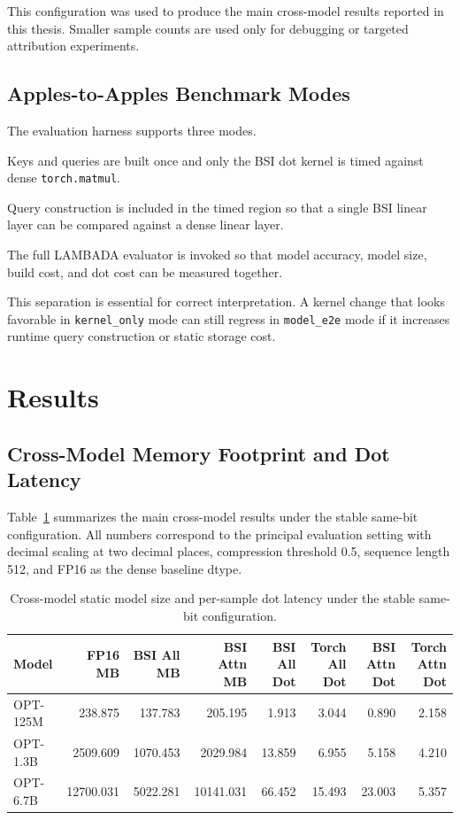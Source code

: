 This configuration was used to produce the main cross-model results reported in this thesis. Smaller sample counts are used only for debugging or targeted attribution experiments.

\subsection{Apples-to-Apples Benchmark Modes}
The evaluation harness supports three modes.

\begin{description}[leftmargin=2em,style=nextline]
\item[\texttt{kernel\_only}] Keys and queries are built once and only the BSI dot kernel is timed against dense \texttt{torch.matmul}.
\item[\texttt{linear\_e2e}] Query construction is included in the timed region so that a single BSI linear layer can be compared against a dense linear layer.
\item[\texttt{model\_e2e}] The full LAMBADA evaluator is invoked so that model accuracy, model size, build cost, and dot cost can be measured together.
\end{description}

This separation is essential for correct interpretation. A kernel change that looks favorable in \texttt{kernel\_only} mode can still regress in \texttt{model\_e2e} mode if it increases runtime query construction or static storage cost.

\section{Results}\label{sec:results}
\subsection{Cross-Model Memory Footprint and Dot Latency}
Table~\ref{tab:crossmodel-latency} summarizes the main cross-model results under the stable same-bit configuration. All numbers correspond to the principal evaluation setting with decimal scaling at two decimal places, compression threshold 0.5, sequence length 512, and FP16 as the dense baseline dtype.

\begin{table}[H]
\centering
\caption{Cross-model static model size and per-sample dot latency under the stable same-bit configuration.}
\label{tab:crossmodel-latency}
\begin{tabular}{lrrrrrrr}
\toprule
Model & FP16 MB & BSI All MB & BSI Attn MB & BSI All Dot & Torch All Dot & BSI Attn Dot & Torch Attn Dot \\
\midrule
OPT-125M & 238.875 & 137.783 & 205.195 & 1.913 & 3.044 & 0.890 & 2.158 \\
OPT-1.3B & 2509.609 & 1070.453 & 2029.984 & 13.859 & 6.955 & 5.158 & 4.210 \\
OPT-6.7B & 12700.031 & 5022.281 & 10141.031 & 66.452 & 15.493 & 23.003 & 5.357 \\
\bottomrule
\end{tabular}
\end{table}

